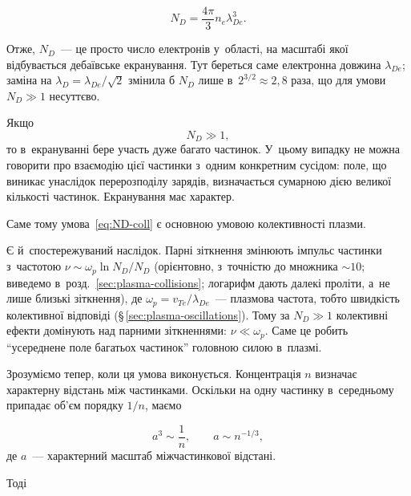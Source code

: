 \begin{equation}\label{eq:ND}
    N_D=\frac{4\pi}{3}n_e\lambda_{De}^3.
\end{equation}

Отже, $N_D$~--- це просто число електронів у~області, на масштабі якої відбувається
дебаївське екранування. Тут береться саме електронна довжина $\lambda_{De}$; заміна на
$\lambda_D=\lambda_{De}/\sqrt2$ змінила б $N_D$ лише в~$2^{3/2}\approx2{,}8$ раза, що для умови
$N_D\gg1$ несуттєво.

Якщо
\begin{equation}\label{eq:ND-coll}
    N_D\gg1,
\end{equation}
то в~екрануванні бере участь дуже багато частинок. У~цьому випадку не можна говорити про
взаємодію цієї частинки з~одним конкретним сусідом: поле, що виникає унаслідок
перерозподілу зарядів, визначається сумарною дією великої кількості частинок. Екранування
має  характер.

Саме тому умова~\eqref{eq:ND-coll} є основною умовою колективності плазми.

Є й~спостережуваний наслідок. Парні зіткнення змінюють імпульс частинки з~частотою $\nu\sim\omega_p\ln N_D/N_D$
(орієнтовно, з~точністю до множника $\sim10$; виведемо в~розд.~\ref{sec:plasma-collisions}; логарифм дають далекі проліти, а~не лише близькі зіткнення),
де $\omega_p=v_{Te}/\lambda_{De}$~--- плазмова частота, тобто швидкість
колективної відповіді (§\,\ref{sec:plasma-oscillations}). Тому за $N_D\gg1$ колективні ефекти домінують над парними
зіткненнями: $\nu\ll\omega_p$. Саме це робить \enquote{усереднене поле багатьох частинок} головною силою в~плазмі.

Зрозуміємо тепер, коли ця умова виконується. Концентрація $n$ визначає характерну відстань
між частинками. Оскільки на одну частинку в~середньому припадає об'єм порядку $1/n$, маємо

\begin{equation*}
    a^3\sim\frac{1}{n},
    \qquad
    a\sim n^{-1/3},
\end{equation*}
де $a$~--- характерний масштаб міжчастинкової відстані.

Тоді

